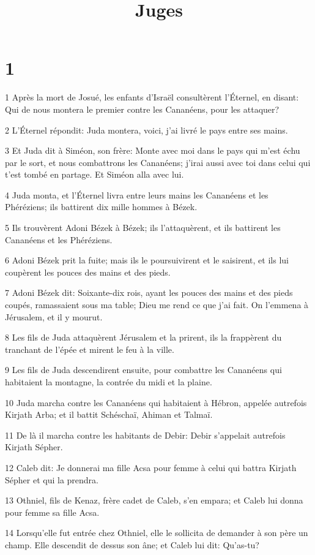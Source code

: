 

\title{Juges}


\chapter{1}

\par 1 Après la mort de Josué, les enfants d'Israël consultèrent l'Éternel, en disant: Qui de nous montera le premier contre les Cananéens, pour les attaquer?
\par 2 L'Éternel répondit: Juda montera, voici, j'ai livré le pays entre ses mains.
\par 3 Et Juda dit à Siméon, son frère: Monte avec moi dans le pays qui m'est échu par le sort, et nous combattrons les Cananéens; j'irai aussi avec toi dans celui qui t'est tombé en partage. Et Siméon alla avec lui.
\par 4 Juda monta, et l'Éternel livra entre leurs mains les Cananéens et les Phéréziens; ils battirent dix mille hommes à Bézek.
\par 5 Ils trouvèrent Adoni Bézek à Bézek; ils l'attaquèrent, et ils battirent les Cananéens et les Phéréziens.
\par 6 Adoni Bézek prit la fuite; mais ils le poursuivirent et le saisirent, et ils lui coupèrent les pouces des mains et des pieds.
\par 7 Adoni Bézek dit: Soixante-dix rois, ayant les pouces des mains et des pieds coupés, ramassaient sous ma table; Dieu me rend ce que j'ai fait. On l'emmena à Jérusalem, et il y mourut.
\par 8 Les fils de Juda attaquèrent Jérusalem et la prirent, ils la frappèrent du tranchant de l'épée et mirent le feu à la ville.
\par 9 Les fils de Juda descendirent ensuite, pour combattre les Cananéens qui habitaient la montagne, la contrée du midi et la plaine.
\par 10 Juda marcha contre les Cananéens qui habitaient à Hébron, appelée autrefois Kirjath Arba; et il battit Schéschaï, Ahiman et Talmaï.
\par 11 De là il marcha contre les habitants de Debir: Debir s'appelait autrefois Kirjath Sépher.
\par 12 Caleb dit: Je donnerai ma fille Acsa pour femme à celui qui battra Kirjath Sépher et qui la prendra.
\par 13 Othniel, fils de Kenaz, frère cadet de Caleb, s'en empara; et Caleb lui donna pour femme sa fille Acsa.
\par 14 Lorsqu'elle fut entrée chez Othniel, elle le sollicita de demander à son père un champ. Elle descendit de dessus son âne; et Caleb lui dit: Qu'as-tu?
